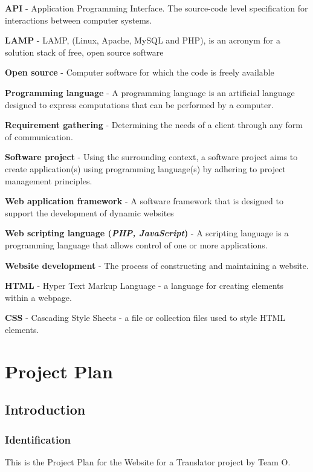 \documentclass{l3proj}
\begin{document}
\begin{itemize}
\small{
\item{\textbf{API} - Application Programming Interface. The source-code level specification for interactions between computer systems.}
\item{\textbf{LAMP} - LAMP, (Linux, Apache, MySQL and PHP), is an acronym for a solution stack of free, open source software}
\item{\textbf{Open source} - Computer software for which the code is freely available }
\item{\textbf{Programming language} - A programming language is an artificial language designed to express computations that can be performed by a computer.}
\item{\textbf{Requirement gathering} - Determining the needs of a client through any form of communication.}
\item{\textbf{Software project} - Using the surrounding context, a software project aims to create application(s) using programming language(s) by adhering to project management principles.}
\item{\textbf{Web application framework} - A software framework that is designed to support the development of dynamic websites }
\item{\textbf{Web scripting language (\textit{PHP, JavaScript})} - A scripting language is a programming language that allows control of one or more applications.}
\item{\textbf{Website development} - The process of constructing and maintaining a website.}
\item{\textbf{HTML} - Hyper Text Markup Language - a language for creating elements within a webpage.}
\item{\textbf{CSS} - Cascading Style Sheets - a file or collection files used to style HTML elements.}
}
\end{itemize}

\chapter{Project Plan}
\label{chap:proj-plan}
\section{Introduction}
\label{sect:pp-intro}
\subsection{Identification}
This is the Project Plan for the Website for a Translator project by Team O.
\end{document}
